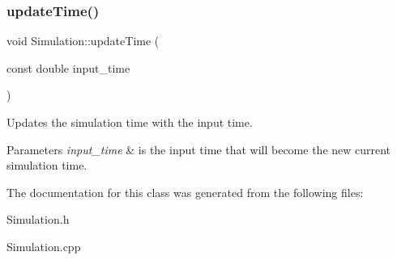 \subsubsection{\texorpdfstring{update\+Time()}{updateTime()}}
{\footnotesize\ttfamily void Simulation\+::update\+Time (\begin{DoxyParamCaption}\item[{const double}]{input\+\_\+time }\end{DoxyParamCaption})\hspace{0.3cm}{\ttfamily [protected]}}



Updates the simulation time with the input time. 


\begin{DoxyParams}{Parameters}
{\em input\+\_\+time} & is the input time that will become the new current simulation time. \\
\hline
\end{DoxyParams}


The documentation for this class was generated from the following files\+:\begin{DoxyCompactItemize}
\item 
Simulation.\+h\item 
Simulation.\+cpp\end{DoxyCompactItemize}

